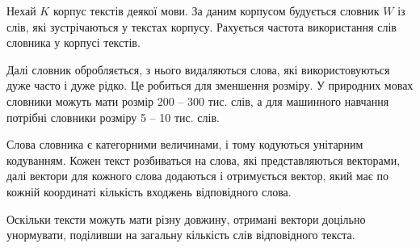 Нехай $K$ корпус текстів деякої мови. За даним корпусом будується словник $W$ із слів, які зустрічаються у текстах корпусу. Рахується частота використання слів словника у корпусі текстів.

Далі словник обробляється, з нього видаляються слова, які використовуються дуже часто і дуже рідко. Це робиться для зменшення розміру. У природних мовах словники можуть мати розмір 200 -- 300 тис. слів, а для машинного навчання потрібні словники розміру 5 -- 10 тис. слів.

Слова словника є категорними величинами, і тому кодуються унітарним кодуванням. 
Кожен текст розбиваться на слова, які представляються векторами,  далі вектори для кожного слова додаються і отримується вектор, який має по кожній координаті кількість входжень відповідного слова.

Оскільки тексти можуть мати різну довжину, отримані вектори доцільно унормувати, поділивши на загальну кількість слів відповідного текста.


